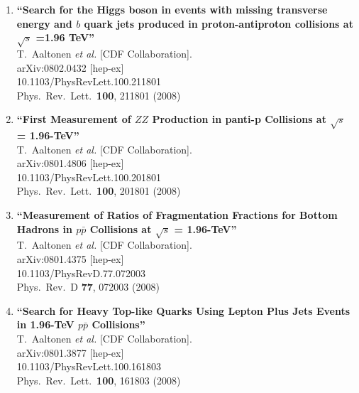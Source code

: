 \documentclass{article}
\begin{document}
\begin{enumerate}
\item%
{\bf ``Search for the Higgs boson in events with missing transverse energy and $b$ quark jets produced in proton-antiproton collisions at $\sqrt{s}$ =1.96 TeV''}
  \\{}T.~Aaltonen {\it et al.}  [CDF Collaboration].
  \\{}arXiv:0802.0432 [hep-ex]
    \\{}10.1103/PhysRevLett.100.211801
\\{}Phys.\ Rev.\ Lett.\  {\bf 100}, 211801 (2008) %


\item%
{\bf ``First Measurement of $Z Z$ Production in panti-p Collisions at $\sqrt{s}$ = 1.96-TeV''}
  \\{}T.~Aaltonen {\it et al.}  [CDF Collaboration].
  \\{}arXiv:0801.4806 [hep-ex]
    \\{}10.1103/PhysRevLett.100.201801
\\{}Phys.\ Rev.\ Lett.\  {\bf 100}, 201801 (2008) %


\item%
{\bf ``Measurement of Ratios of Fragmentation Fractions for Bottom Hadrons in $p \bar{p}$ Collisions at $\sqrt{s}$ = 1.96-TeV''}
  \\{}T.~Aaltonen {\it et al.}  [CDF Collaboration].
  \\{}arXiv:0801.4375 [hep-ex]
    \\{}10.1103/PhysRevD.77.072003
\\{}Phys.\ Rev.\ D {\bf 77}, 072003 (2008) %


\item%
{\bf ``Search for Heavy Top-like Quarks Using Lepton Plus Jets Events in 1.96-TeV $p \bar{p}$ Collisions''}
  \\{}T.~Aaltonen {\it et al.}  [CDF Collaboration].
  \\{}arXiv:0801.3877 [hep-ex]
    \\{}10.1103/PhysRevLett.100.161803
\\{}Phys.\ Rev.\ Lett.\  {\bf 100}, 161803 (2008) %



\end{enumerate}
\end{document}
